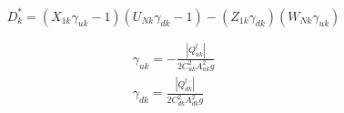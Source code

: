 \documentclass[11pt]{article}
\begin{document}
\begin{equation}
  D_k^* = (X_{1k} \gamma_{uk} - 1)(U_{Nk} \gamma_{dk} - 1) - (Z_{1k} \gamma_{dk})(W_{Nk} \gamma_{uk})
\end{equation}

\begin{align}
  \gamma_{uk} = -\frac{|Q_{uk}^{t}|}{2 C_{uk}^2 A_{uk}^2 g} \\
  \gamma_{dk} = \frac{|Q_{dk}^{t}|}{2 C_{dk}^2 A_{dk}^2 g}
\end{align}









\end{document}
